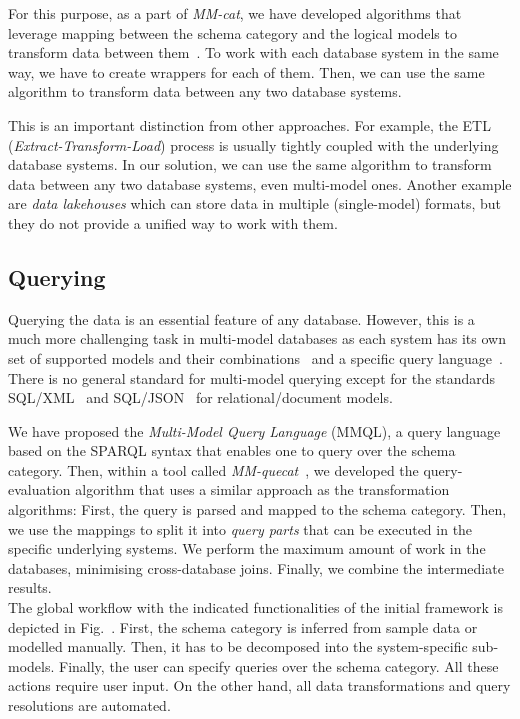 For this purpose, as a part of \textit{MM-cat}, we have developed algorithms that leverage mapping between the schema category and the logical models to transform data between them~\citep{mm_cat_journal}.
To work with each database system in the same way, we have to create wrappers for each of them. Then, we can use the same algorithm to transform data between any two database systems.

This is an important distinction from other approaches. For example, the ETL (\emph{Extract-Transform-Load}) process is usually tightly coupled with the underlying database systems. In our solution, we can use the same algorithm to transform data between any two database systems, even multi-model ones. Another example are \emph{data lakehouses} which can store data in multiple (single-model) formats, but they do not provide a unified way to work with them.

\subsection{Querying}
Querying the data is an essential feature of any database. However, this is a much more challenging task in multi-model databases as each system has its own set of supported models and their combinations~\citep{CSUR-Jiaheng} and a specific query language~\citep{Jiaheng2023Survey}. There is no general standard for multi-model querying except for the standards SQL/XML~\citep{SQLXML} and SQL/JSON~\citep{SQLJSON} for relational/document models.

We have proposed the \textit{Multi-Model Query Language} (MMQL), a query language based on the SPARQL syntax that enables one to query over the schema category. Then, within a tool called \textit{MM-quecat}~\citep{mm_quecat}, we developed the query-evaluation algorithm that uses a similar approach as the transformation algorithms: First, the query is parsed and mapped to the schema category. Then, we use the mappings to split it into \emph{query parts} that can be executed in the specific underlying systems. We perform the maximum amount of work in the databases, minimising cross-database joins. Finally, we combine the intermediate results.
\\

\noindent The global workflow with the indicated functionalities of the initial framework is depicted in Fig.~. First, the schema category is inferred from sample data or modelled manually. Then, it has to be decomposed into the system-specific sub-models. Finally, the user can specify queries over the schema category. All these actions require user input. On the other hand, all data transformations and query resolutions are automated.

